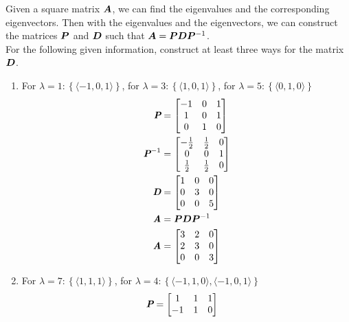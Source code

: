 \documentclass{article}
\begin{document}
Given a square matrix $ \matr{A} $, we can find the eigenvalues and the corresponding eigenvectors. Then with the eigenvalues and the eigenvectors, we can construct the matrices $ \matr{P} $ and $ \matr{D} $ such that $ \matr{A} = \matr{P}\matr{D}\matr{P}^{-1} $. \\
For the following given information, construct at least three ways for the matrix $ \matr{D} $.
\begin{enumerate}[label = \textbf{\arabic*)}]
	\item For $ \lambda = 1 : \left\{ \langle -1, 0, 1 \rangle \right\} $, for $ \lambda = 3 : \left\{ \langle 1, 0, 1 \rangle \right\} $, for $ \lambda = 5 : \left\{ \langle 0, 1, 0 \rangle \right\} $
		\begin{align*}
			\matr{P} & =
				\begin{bmatrix}
					-1 & 0 & 1 \\
					1 & 0 & 1 \\
					0 & 1 & 0
				\end{bmatrix} \\
			\matr{P}^{-1} & =
				\begin{bmatrix}
					-\frac{1}{2} & \frac{1}{2} & 0 \\
					0 & 0 & 1 \\
					\frac{1}{2} & \frac{1}{2} & 0
				\end{bmatrix} \\
			\matr{D} & =
				\begin{bmatrix}
					1 & 0 & 0 \\
					0 & 3 & 0 \\
					0 & 0 & 5
				\end{bmatrix} \\
			\matr{A} & = \matr{P}\matr{D}\matr{P}^{-1} \\
			\matr{A} & =
				\begin{bmatrix}
					3 & 2 & 0 \\
					2 & 3 & 0 \\
					0 & 0 & 3
				\end{bmatrix}
		\end{align*}
	\item For $ \lambda = 7 : \left\{ \langle 1, 1, 1 \rangle \right\} $, for $ \lambda = 4 : \left\{ \langle -1, 1, 0 \rangle, \langle -1, 0, 1 \rangle \right\} $
		\begin{align*}
			\matr{P} & =
				\begin{bmatrix}
					1 & 1 & 1 \\
					-1 & 1 & 0 \\

\end{bmatrix}
\end{align*}
\end{enumerate}
\end{document}
